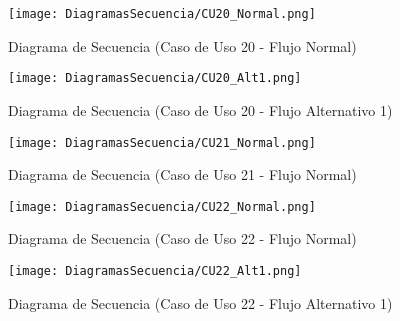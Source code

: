 \begin{landscape}
  \label{fig:Secuencia_CU20_Normal}
  \vspace*{\fill}
  \begin{figure}[!htbp]
    \centering
    \texttt{[image: DiagramasSecuencia/CU20\_Normal.png]}
    \caption{Diagrama de Secuencia (Caso de Uso 20 - Flujo Normal)}
  \end{figure}
  \vfill
\end{landscape}
\FloatBarrier

\begin{landscape}
  \label{fig:Secuencia_CU20_Alt1}
  \vspace*{\fill}
  \begin{figure}[!htbp]
    \centering
    \texttt{[image: DiagramasSecuencia/CU20\_Alt1.png]}
    \caption{Diagrama de Secuencia (Caso de Uso 20 - Flujo Alternativo 1)}
  \end{figure}
  \vfill
\end{landscape}
\FloatBarrier

\begin{landscape}
  \label{fig:Secuencia_CU21_Normal}
  \vspace*{\fill}
  \begin{figure}[!htbp]
    \centering
    \texttt{[image: DiagramasSecuencia/CU21\_Normal.png]}
    \caption{Diagrama de Secuencia (Caso de Uso 21 - Flujo Normal)}
  \end{figure}
  \vfill
\end{landscape}
\FloatBarrier

\begin{landscape}
  \label{fig:Secuencia_CU22_Normal}
  \vspace*{\fill}
  \begin{figure}[!htbp]
    \centering
    \texttt{[image: DiagramasSecuencia/CU22\_Normal.png]}
    \caption{Diagrama de Secuencia (Caso de Uso 22 - Flujo Normal)}
  \end{figure}
  \vfill
\end{landscape}
\FloatBarrier

\begin{landscape}
  \label{fig:Secuencia_CU22_Alt1}
  \vspace*{\fill}
  \begin{figure}[!htbp]
    \centering
    \texttt{[image: DiagramasSecuencia/CU22\_Alt1.png]}
    \caption{Diagrama de Secuencia (Caso de Uso 22 - Flujo Alternativo 1)}
  \end{figure}
  \vfill
\end{landscape}
\FloatBarrier


